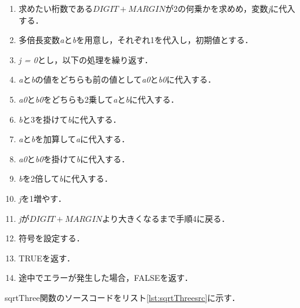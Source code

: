 \documentclass[a4paper,11pt,dvipdfmx]{jsarticle}
\begin{document}
\begin{enumerate}
    \item 求めたい桁数である$DIGIT + MARGIN$が2の何乗かを求めめ，変数\textit{j}に代入する．
    \item 多倍長変数\textit{a}と\textit{b}を用意し，それぞれ1を代入し，初期値とする．
    \item \textit{j = 0}とし，以下の処理を繰り返す．
    \item \textit{a}と\textit{b}の値をどちらも前の値として\textit{a0}と\textit{b0}に代入する．
    \item \textit{a0}と\textit{b0}をどちらも2乗して\textit{a}と\textit{b}に代入する．
    \item \textit{b}と3を掛けて\textit{b}に代入する．
    \item \textit{a}と\textit{b}を加算して\textit{a}に代入する．
    \item \textit{a0}と\textit{b0}を掛けて\textit{b}に代入する．
    \item \textit{b}を2倍して\textit{b}に代入する．
    \item \textit{j}を1増やす．
    \item \textit{j}が$DIGIT + MARGIN$より大きくなるまで手順4に戻る．
    \item 符号を設定する．
    \item TRUEを返す．
    \item 途中でエラーが発生した場合，FALSEを返す．
\end{enumerate}

sqrtThree関数のソースコードをリスト\ref{lst:sqrtThreesrc}に示す．
\end{document}
